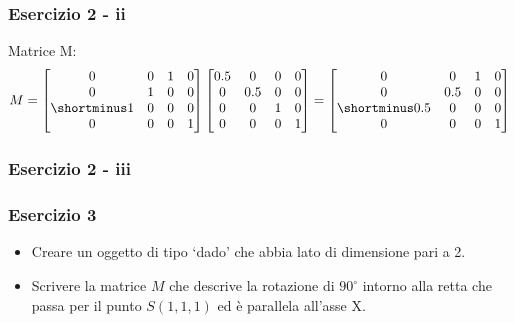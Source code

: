 \documentclass{beamer}
\newcommand{\fig}{figures} %
\begin{document}
\begin{frame}
\frametitle{Esercizio 2 - ii}
Matrice M:
\begin{displaymath}
M = 
\begin{bmatrix}
        0 & 0 & 1 & 0\\
        0 & 1 & 0 & 0 \\
        \shortminus 1 & 0 & 0 & 0 \\
        0 & 0 & 0 & 1 
\end{bmatrix}
\begin{bmatrix}
    0.5 & 0   & 0   & 0 \\
      0 & 0.5 & 0   & 0 \\
      0 & 0   & 1   & 0 \\
      0 & 0   & 0   & 1 
\end{bmatrix}
 = 
\begin{bmatrix}
        0 & 0 & 1 & 0\\
        0 & 0.5 & 0 & 0 \\
        \shortminus 0.5 & 0 & 0 & 0 \\
        0 & 0 & 0 & 1 
\end{bmatrix}
\end{displaymath}
\end{frame}

\begin{frame}
\frametitle{Esercizio 2 - iii}
\begin{center}
\end{center}
\end{frame}

\begin{frame}
\frametitle{Esercizio 3}
\begin{itemize}
    \item Creare un oggetto di tipo `dado' che abbia lato di dimensione pari a 2.
    \item Scrivere la matrice $M$ che descrive la rotazione di $90^\circ$ intorno alla retta 
        che passa per il punto $S(1, 1, 1)$ ed \`e parallela all'asse X.
\end{itemize}
\end{frame}
\end{document}
